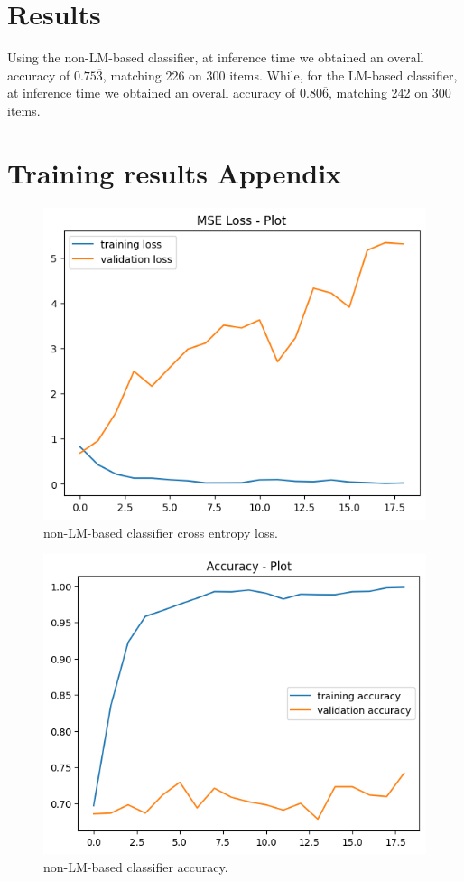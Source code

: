 \documentclass[11pt]{article}
\begin{document}
\section{Results}
Using the non-LM-based classifier, at inference time we obtained an overall accuracy of $0.75\overline{3}$, matching 226 on 300 items. While, for the LM-based classifier, at inference time we obtained an overall accuracy of $0.80\overline{6}$, matching 242 on 300 items. 

\appendix
\section{Training results Appendix}
\label{sec:appendix1}

\begin{figure}
    \includegraphics[width=\linewidth]{loss-no-transformer.png}
    \caption{non-LM-based classifier cross entropy loss.}
    \label{fig:1}
\end{figure}
	
\begin{figure}
    \includegraphics[width=\linewidth]{accuracy-no-transformer.png}
    \caption{non-LM-based classifier accuracy.}
    \label{fig:2}
\end{figure}
	
\end{document}
